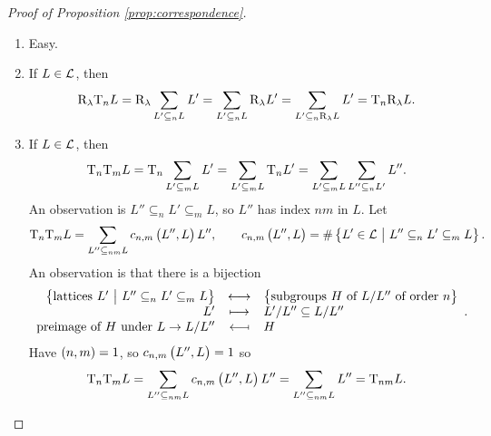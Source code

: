 \begin{proof}[Proof of Proposition \ref{prop:correspondence}]
\hfill
\begin{enumerate}
\item Easy.
\item If $ L \in \mathcal{L} $, then
$$ \mathrm{R}_\lambda\mathrm{T}_nL = \mathrm{R}_\lambda\sum_{L' \subseteq_n L} L' = \sum_{L' \subseteq_n L} \mathrm{R}_\lambda L' = \sum_{L' \subseteq_n \mathrm{R}_\lambda L} L' = \mathrm{T}_n\mathrm{R}_\lambda L. $$
\item If $ L \in \mathcal{L} $, then
$$ \mathrm{T}_n\mathrm{T}_mL = \mathrm{T}_n\sum_{L' \subseteq_m L} L' = \sum_{L' \subseteq_m L} \mathrm{T}_nL' = \sum_{L' \subseteq_m L} \sum_{L'' \subseteq_n L'} L''. $$
An observation is $ L'' \subseteq_n L' \subseteq_m L $, so $ L'' $ has index $ nm $ in $ L $. Let
$$ \T_n\T_mL = \sum_{L'' \subseteq_{nm} L} c_{n, m}\br{L'', L}L'', \qquad c_{n, m}\br{L'', L} = \#\cbr{L' \in \LLL \st L'' \subseteq_n L' \subseteq_m L}. $$
An observation is that there is a bijection
$$ \bijection{\cbr{\text{lattices} \ L' \st L'' \subseteq_n L' \subseteq_m L}}{\cbr{\text{subgroups} \ H \ \text{of} \ L / L'' \ \text{of order} \ n}}{L'}{L' / L'' \subseteq L / L''}{\text{preimage of} \ H \ \text{under} \ L \to L / L''}{H}. $$
Have $ \br{n, m} = 1 $, so $ c_{n, m}\br{L'', L} = 1 $ so
$$ \T_n\T_mL = \sum_{L'' \subseteq_{nm} L} c_{n, m}\br{L'', L}L'' = \sum_{L'' \subseteq_{nm} L} L'' = \T_{nm}L. $$

\pagebreak


\end{enumerate}
\end{proof}

